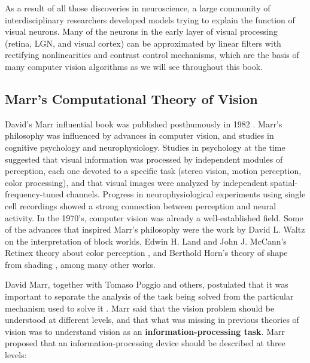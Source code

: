 As a result of all those discoveries in neuroscience, a large community of interdisciplinary researchers developed models trying to explain the function of visual neurons. Many of the neurons in the early layer of visual processing (retina, LGN, and visual cortex) can be approximated by linear filters with rectifying nonlinearities and contrast control mechanisms, which are the basis of many computer vision algorithms as we will see throughout this book.











\subsection{Marr's Computational Theory of Vision}


David’s Marr influential book  was published posthumously in 1982 \cite{Marr82}.
Marr’s philosophy was influenced by advances in computer vision, and studies in cognitive psychology and neurophysiology. Studies in psychology at the time suggested that visual information was processed by independent modules of perception, each one devoted to a specific task (stereo vision, motion perception, color processing), and that visual images were analyzed by independent spatial-frequency-tuned channels. Progress in neurophysiological experiments using single cell recordings showed a strong connection between perception and neural activity. In the 1970’s, computer vision was already a well-established field. Some of the advances that inspired Marr's philosophy were the work by David L. Waltz \cite{Waltz1972GeneratingSD} on the interpretation of block worlds, Edwin H. Land and John J. McCann’s Retinex theory about color perception \cite{Land1971}, and Berthold Horn’s theory of shape from shading \cite{Horn1977}, among many other works.

David Marr, together with Tomaso Poggio and others, postulated that it was important to separate the analysis of the task being solved from the particular mechanism used to solve it \cite{Marr82}. Marr said that the vision problem should be understood at different levels, and that what was missing in previous theories of vision was to understand vision as an {\bf information-processing task}. Marr proposed that an information-processing device should be described at three levels:

